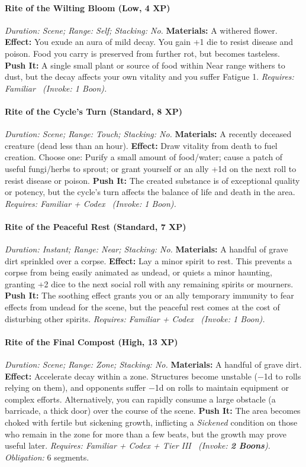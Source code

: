 \paragraph{Rite of the Wilting Bloom (Low, 4 XP)} \emph{Duration: Scene; Range: Self; Stacking: No.}
\textbf{Materials:} A withered flower.
\textbf{Effect:} You exude an aura of mild decay. You gain +1 die to resist disease and poison. Food you carry is preserved from further rot, but becomes tasteless.
\textbf{Push It:} A single small plant or source of food within Near range withers to dust, but the decay affects your own vitality and you suffer Fatigue 1.
\emph{Requires: Familiar \ (\textit{Invoke:} 1 Boon).}
\paragraph{Rite of the Cycle's Turn (Standard, 8 XP)} \emph{Duration: Scene; Range: Touch; Stacking: No.}
\textbf{Materials:} A recently deceased creature (dead less than an hour).
\textbf{Effect:} Draw vitality from death to fuel creation. Choose one: Purify a small amount of food/water; cause a patch of useful fungi/herbs to sprout; or grant yourself or an ally +1d on the next roll to resist disease or poison.
\textbf{Push It:} The created substance is of exceptional quality or potency, but the cycle's turn affects the balance of life and death in the area.
\emph{Requires: Familiar + Codex \ (\textit{Invoke:} 1 Boon).}
\paragraph{Rite of the Peaceful Rest (Standard, 7 XP)} \emph{Duration: Instant; Range: Near; Stacking: No.}
\textbf{Materials:} A handful of grave dirt sprinkled over a corpse.
\textbf{Effect:} Lay a minor spirit to rest. This prevents a corpse from being easily animated as undead, or quiets a minor haunting, granting +2 dice to the next social roll with any remaining spirits or mourners.
\textbf{Push It:} The soothing effect grants you or an ally temporary immunity to fear effects from undead for the scene, but the peaceful rest comes at the cost of disturbing other spirits.
\emph{Requires: Familiar + Codex \ (\textit{Invoke:} 1 Boon).}
\paragraph{Rite of the Final Compost (High, 13 XP)} \emph{Duration: Scene; Range: Zone; Stacking: No.}
\textbf{Materials:} A handful of grave dirt.
\textbf{Effect:} Accelerate decay within a zone. Structures become unstable (−1d to rolls relying on them), and opponents suffer −1d on rolls to maintain equipment or complex efforts. Alternatively, you can rapidly consume a large obstacle (a barricade, a thick door) over the course of the scene.
\textbf{Push It:} The area becomes choked with fertile but sickening growth, inflicting a \emph{Sickened} condition on those who remain in the zone for more than a few beats, but the growth may prove useful later.
\emph{Requires: Familiar + Codex + Tier III \ (\textit{Invoke:} \textbf{2 Boons}).}
\emph{Obligation:} 6 segments.

